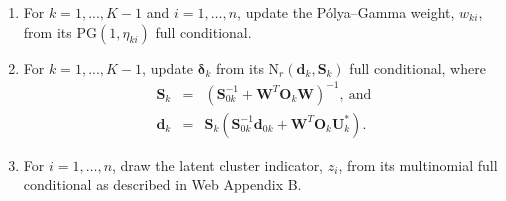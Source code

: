 \documentclass[useAMS,usenatbib,referee]{biom}
\begin{document}
\begin{enumerate}
\item For $k = 1,...,K-1$ and $i=1,\ldots,n$, update the P\'olya--Gamma weight, $w_{ki}$, from its PG$(1,\eta_{ki})$ full conditional.

\item For $k = 1,...,K-1$, update $\boldsymbol\delta_k$ from its $\text{N}_r(\mathbf{d}_{k},\mathbf{S}_{k})$ full conditional, where
\begin{eqnarray}
	\mathbf{S}_{k} &=& (\mathbf{S}^{-1}_{0k} + \mathbf{W}^T\mathbf{O}_k\mathbf{W})^{-1}, \ \text{and} \nonumber\\
	\mathbf{d}_{k} &=& \mathbf{S}_{k}(\mathbf{S}^{-1}_{0k}\mathbf{d}_{0k} + \mathbf{W}^T \mathbf{O}_k \mathbf{U}^*_k).\nonumber \label{eq:pg_coef_updates}
\end{eqnarray}
\item For $i=1,\ldots,n$, draw the latent cluster indicator, $z_i$, from its multinomial full conditional as described in Web Appendix B.
\end{enumerate}
\end{document}
